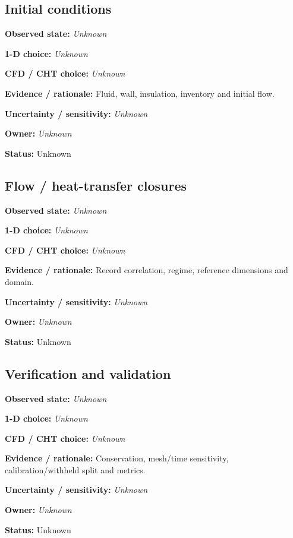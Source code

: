 \documentclass[11pt]{article}
\begin{document}
\begin{minipage}{\textwidth}\small\setlength{\parskip}{2pt}
\subsection*{Initial conditions}
\textbf{Observed state:} \textit{Unknown}\par
\textbf{1-D choice:} \textit{Unknown}\par
\textbf{CFD / CHT choice:} \textit{Unknown}\par
\textbf{Evidence / rationale:} Fluid, wall, insulation, inventory and initial flow.\par
\textbf{Uncertainty / sensitivity:} \textit{Unknown}\par
\textbf{Owner:} \textit{Unknown}\par
\textbf{Status:} Unknown\par
\end{minipage}\par\vspace{5pt}
\begin{minipage}{\textwidth}\small\setlength{\parskip}{2pt}
\subsection*{Flow / heat-transfer closures}
\textbf{Observed state:} \textit{Unknown}\par
\textbf{1-D choice:} \textit{Unknown}\par
\textbf{CFD / CHT choice:} \textit{Unknown}\par
\textbf{Evidence / rationale:} Record correlation, regime, reference dimensions and domain.\par
\textbf{Uncertainty / sensitivity:} \textit{Unknown}\par
\textbf{Owner:} \textit{Unknown}\par
\textbf{Status:} Unknown\par
\end{minipage}\par\vspace{5pt}
\begin{minipage}{\textwidth}\small\setlength{\parskip}{2pt}
\subsection*{Verification and validation}
\textbf{Observed state:} \textit{Unknown}\par
\textbf{1-D choice:} \textit{Unknown}\par
\textbf{CFD / CHT choice:} \textit{Unknown}\par
\textbf{Evidence / rationale:} Conservation, mesh/time sensitivity, calibration/withheld split and metrics.\par
\textbf{Uncertainty / sensitivity:} \textit{Unknown}\par
\textbf{Owner:} \textit{Unknown}\par
\textbf{Status:} Unknown\par
\end{minipage}\par\vspace{5pt}
\end{document}
